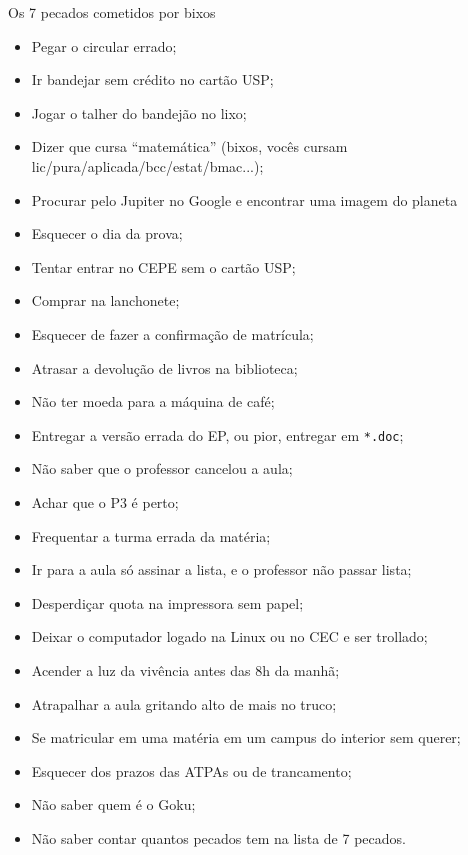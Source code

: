 \begin{editorial}{Os 7 pecados cometidos por bixos}

\begin{itemize}
  \item Pegar o circular errado;
  \item Ir bandejar sem crédito no cartão USP;
  \item Jogar o talher do bandejão no lixo;
  \item Dizer que cursa ``matemática'' (bixos, vocês cursam
        lic/pura/aplicada/bcc/estat/bmac...);
  \item Procurar pelo Jupiter no Google e encontrar uma imagem do planeta
  \item Esquecer o dia da prova;
  \item Tentar entrar no CEPE sem o cartão USP;
  \item Comprar na lanchonete;
  \item Esquecer de fazer a confirmação de matrícula;
  \item Atrasar a devolução de livros na biblioteca;
  \item Não ter moeda para a máquina de café;
  \item Entregar a versão errada do EP, ou pior, entregar em \texttt{*.doc};
  \item Não saber que o professor cancelou a aula;
  \item Achar que o P3 é perto;
  \item Frequentar a turma errada da matéria;
  \item Ir para a aula só assinar a lista, e o professor não passar lista;
  \item Desperdiçar quota na impressora sem papel;
  \item Deixar o computador logado na Linux ou no CEC e ser trollado;
  \item Acender a luz da vivência antes das 8h da manhã;
  \item Atrapalhar a aula gritando alto de mais no truco;
  \item Se matricular em uma matéria em um campus do interior sem querer;
  \item Esquecer dos prazos das ATPAs ou de trancamento;
  \item Não saber quem é o Goku;
  \item Não saber contar quantos pecados tem na lista de 7 pecados.
\end{itemize}

\end{editorial}
